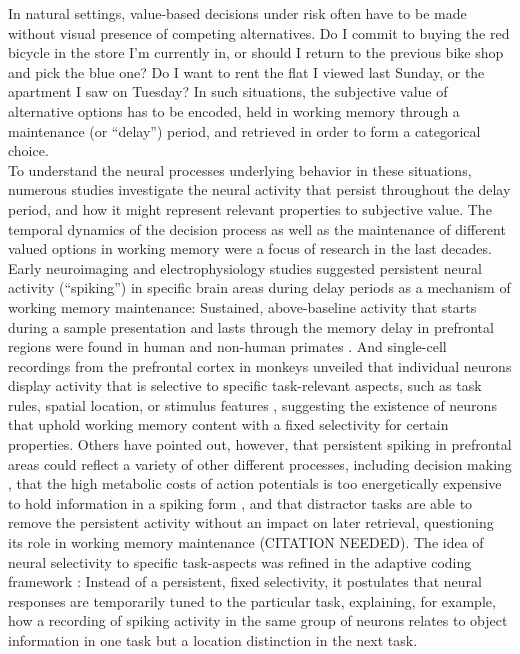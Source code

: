 In natural settings, value-based decisions under risk often have to be made without visual presence of competing alternatives.
Do I commit to buying the red bicycle in the store I'm currently in, or should I return to the previous bike shop and pick the blue one?
Do I want to rent the flat I viewed last Sunday, or the apartment I saw on Tuesday?
In such situations, the subjective value of alternative options has to be encoded, held in working memory through a maintenance (or ``delay'') period, and retrieved in order to form a categorical choice.\\
To understand the neural processes underlying behavior in these situations, numerous studies investigate the neural activity that persist throughout the delay period, and how it might represent relevant properties to subjective value.
The temporal dynamics of the decision process as well as the maintenance of different valued options in working memory were a focus of research in the last decades.
Early neuroimaging and electrophysiology studies suggested persistent neural activity (``spiking'') in specific brain areas during delay periods as a mechanism of working memory maintenance:
Sustained, above-baseline activity that starts during a sample presentation and lasts through the memory delay in prefrontal regions were found in human \citep[e.g.,][]{courtney1997transient} and non-human primates \citep[e.g.,][]{funahashi1989mnemonic, miller1996neural}.
And single-cell recordings from the prefrontal cortex in monkeys unveiled that individual neurons display activity that is selective to specific task-relevant aspects, such as task rules, spatial location, or stimulus features \citep{white1999rule, wallis2001single}, suggesting the existence of neurons that uphold working memory content with a fixed selectivity for certain properties.
Others have pointed out, however, that persistent spiking in prefrontal areas could reflect a variety of other different processes, including decision making \citep{curtis2010beyond}, that the high metabolic costs of action potentials is too energetically expensive to hold information in a spiking form \citep{attwell2001energy}, and that distractor tasks are able to remove the persistent activity without an impact on later retrieval, questioning its role in working memory maintenance (CITATION NEEDED).
The idea of neural selectivity to specific task-aspects was refined in the adaptive coding framework \citep{duncan2001adaptive}:
Instead of a persistent, fixed selectivity, it postulates that neural responses are temporarily tuned to the particular task, explaining, for example, how a recording of spiking activity in the same group of neurons relates to object information in one task but a location distinction in the next task.
